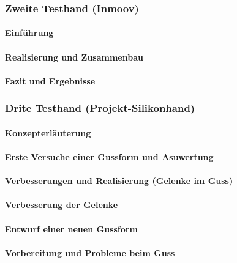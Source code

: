 \documentclass[titlepage,12pt,twoside]{article}
\begin{document}
\subsubsection{Zweite Testhand (Inmoov)}
\paragraph{Einführung}
\hfill \break
\hfill \break

\paragraph{Realisierung und Zusammenbau}
\hfill \break
\hfill \break

\paragraph{Fazit und Ergebnisse}
\hfill \break
\hfill \break

\subsubsection{Drite Testhand (Projekt-Silikonhand)}
\paragraph{Konzepterläuterung}
\hfill \break
\hfill \break

\paragraph{Erste Versuche einer Gussform und Asuwertung}
\hfill \break
\hfill \break

\paragraph{Verbesserungen und Realisierung (Gelenke im Guss)}
\hfill \break
\hfill \break

\paragraph{Verbesserung der Gelenke}
\hfill \break
\hfill \break

\paragraph{Entwurf einer neuen Gussform}
\hfill \break
\hfill \break

\paragraph{Vorbereitung und Probleme beim Guss}
\hfill \break
\hfill \break
\end{document}
